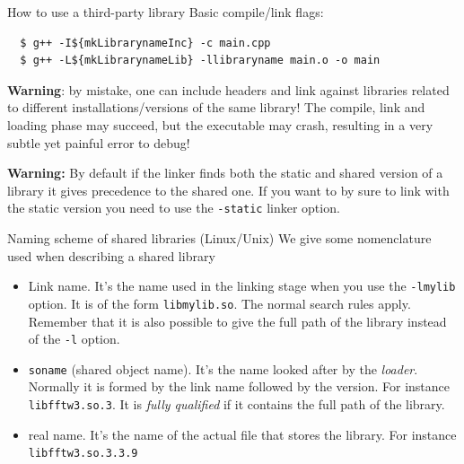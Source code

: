 \documentclass[12pt,aspectratio=169]{beamer}
\begin{document}
  \begin{frame}[fragile]{How to use a third-party library}
    Basic compile/link flags:
  \begin{verbatim}
  $ g++ -I${mkLibrarynameInc} -c main.cpp
  $ g++ -L${mkLibrarynameLib} -llibraryname main.o -o main
  \end{verbatim}
  \bigskip
  \textbf{Warning}: by mistake, one can include headers and link against libraries related to different installations/versions of the same library! The compile, link and loading phase may succeed, but the executable may crash, resulting in a very subtle yet painful error to debug!

  \textbf{Warning:} By default if the linker finds both the static and
  shared version of a library it gives precedence to the shared
  one. If you want to by sure to link with the static version you need to use 
  the \texttt{-static} linker option.
  \end{frame}
  
  
  \begin{frame}{Naming scheme of shared libraries (Linux/Unix)}
    We give some nomenclature used when describing a shared library
  
    \begin{itemize}
    \item Link name. It's the name used in the linking stage when
      you use the \texttt{-lmylib} option.  It is of the
      form \texttt{libmylib.so}. The normal search rules
      apply. Remember that it is also possible to give the full path of
      the library instead of the \texttt{-l} option.
    \item \texttt{soname} (shared object name).  It's the name looked after
      by the \emph{loader}.  Normally it is formed by the link name
      followed by the version.  For instance
      \texttt{libfftw3.so.3}. It is \emph{fully
      qualified} if it contains the full path of the library.
    \item real name. It's the name of the actual file that stores the library. 
      For instance \texttt{libfftw3.so.3.3.9}
    \end{itemize}
  \end{frame}
  
\end{document}
